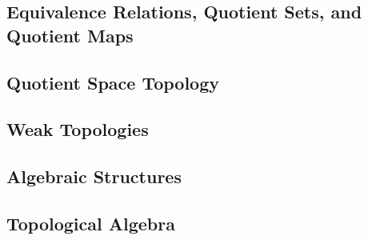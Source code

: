 \subsection{Equivalence Relations, Quotient Sets, and Quotient Maps}

 

 



\subsection{Quotient Space Topology}


\subsection{Weak Topologies}

\subsection{Algebraic Structures}


















\subsection{Topological Algebra}
%



